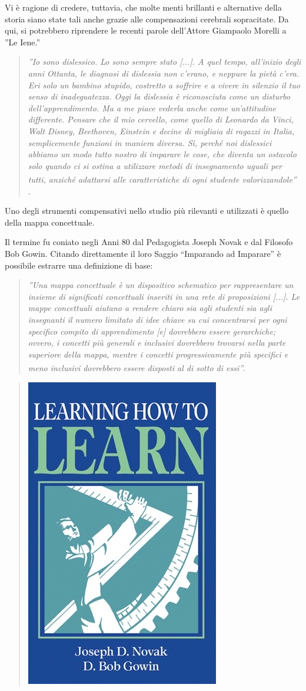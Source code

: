 \documentclass[portrait,a4paper]{article} %
\begin{document}
\par
Vi è ragione di credere, tuttavia, che molte menti brillanti e alternative della storia siano state tali anche grazie alle compensazioni cerebrali sopracitate.
Da qui, si potrebbero riprendere le recenti parole dell'Attore Giampaolo Morelli a ''Le Iene.''
\par
\begin{quote}
\textit{''Io sono dislessico. Lo sono sempre stato [...]. A quel tempo, all'inizio degli anni Ottanta, le diagnosi di dislessia non c'erano, e neppure la pietà c'era. Eri solo un bambino stupido, costretto a soffrire e a vivere in silenzio il tuo senso di inadeguatezza. Oggi la dislessia è riconosciuta come un disturbo dell'apprendimento.
Ma a me piace vederla anche come un'attitudine differente. Pensare che il mio cervello, come quello di Leonardo da Vinci, Walt Disney, Beethoven, Einstein e decine di migliaia di ragazzi in Italia, semplicemente funzioni in maniera diversa. Sì, perché noi dislessici abbiamo un modo tutto nostro di imparare le cose, che diventa un ostacolo solo quando ci si ostina a utilizzare metodi di insegnamento uguali per tutti, anziché adattarsi alle caratteristiche di ogni studente valorizzandole''} \textsuperscript{\cite{morelli}}.
\end{quote}
\par
Uno degli strumenti compensativi nello studio più rilevanti e utilizzati è quello della mappa concettuale.
\par
Il termine fu coniato negli Anni 80 dal Pedagogista Joseph Novak e dal Filosofo Bob Gowin.
Citando direttamente il loro Saggio “Imparando ad Imparare” è possibile estrarre una definizione di base:
\begin{quote}
    \textit{''Una mappa concettuale è un dispositivo schematico per rappresentare un insieme di significati concettuali inseriti in una rete di proposizioni [...]. Le mappe concettuali aiutano a rendere chiaro sia agli studenti sia agli insegnanti il numero limitato di idee chiave su cui concentrarsi per ogni specifico compito di apprendimento [e] dovrebbero essere gerarchiche; ovvero, i concetti più generali e inclusivi dovrebbero trovarsi nella parte superiore della mappa, mentre i concetti progressivamente più specifici e meno inclusivi dovrebbero essere disposti al di sotto di essi''\textsuperscript{\cite{imp}}}.
    \end{quote}
    \begin{quote}
    \centering
    \includegraphics[width=0.3\linewidth]{img/HowToLearn.jpg}
    \end{quote}
\end{document}
